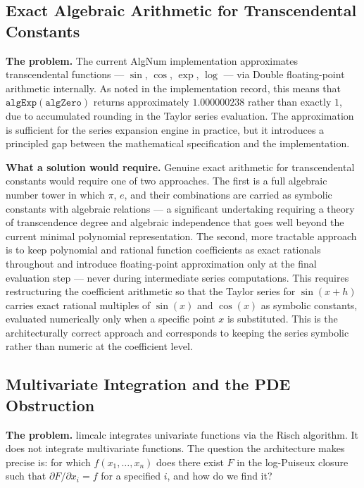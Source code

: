 \documentclass[12pt]{article}
\begin{document}
\subsection{Exact Algebraic Arithmetic for Transcendental
Constants}\label{exact-algebraic-arithmetic-for-transcendental-constants}

\textbf{The problem.} The current AlgNum implementation approximates
transcendental functions --- \(\sin\), \(\cos\), \(\exp\), \(\log\) ---
via Double floating-point arithmetic internally. As noted in the
implementation record, this means that
\(\mathtt{algExp}(\mathtt{algZero})\) returns approximately
\(1.000000238\) rather than exactly \(1\), due to accumulated rounding
in the Taylor series evaluation. The approximation is sufficient for the
series expansion engine in practice, but it introduces a principled gap
between the mathematical specification and the implementation.

\textbf{What a solution would require.} Genuine exact arithmetic for
transcendental constants would require one of two approaches. The first
is a full algebraic number tower in which \(\pi\), \(e\), and their
combinations are carried as symbolic constants with algebraic relations
--- a significant undertaking requiring a theory of transcendence degree
and algebraic independence that goes well beyond the current minimal
polynomial representation. The second, more tractable approach is to
keep polynomial and rational function coefficients as exact rationals
throughout and introduce floating-point approximation only at the final
evaluation step --- never during intermediate series computations. This
requires restructuring the coefficient arithmetic so that the Taylor
series for \(\sin(x+h)\) carries exact rational multiples of \(\sin(x)\)
and \(\cos(x)\) as symbolic constants, evaluated numerically only when a
specific point \(x\) is substituted. This is the architecturally correct
approach and corresponds to keeping the series symbolic rather than
numeric at the coefficient level.




\subsection{Multivariate Integration and the PDE
Obstruction}\label{multivariate-integration-and-the-pde-obstruction}

\textbf{The problem.} limcalc integrates univariate functions via the
Risch algorithm. It does not integrate multivariate functions. The
question the architecture makes precise is: for which
\(f(x_1, \ldots, x_n)\) does there exist \(F\) in the log-Puiseux
closure such that \(\partial F / \partial x_i = f\) for a specified
\(i\), and how do we find it?
\end{document}
